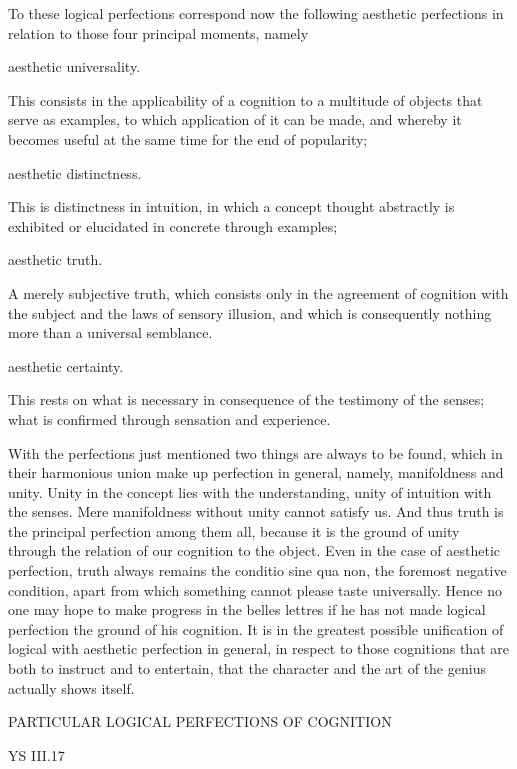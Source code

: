 To these logical perfections correspond now the following aesthetic
perfections in relation to those four principal moments, namely

aesthetic universality.

    This consists in the applicability of a cognition to a
    multitude of objects that serve as examples,
    to which application of it can be made,
    and whereby it becomes useful at the same time for the end of popularity;

aesthetic distinctness.

    This is distinctness in intuition, in which a concept
    thought abstractly is exhibited or elucidated in concrete through examples;

aesthetic truth.

    A merely subjective truth, which consists only in the agreement
    of cognition with the subject and the laws of sensory illusion,
    and which is consequently nothing more than a universal semblance.

aesthetic certainty.

    This rests on what is necessary in consequence of
    the testimony of the senses;
    what is confirmed through sensation and experience.

        With the perfections just mentioned two things are always to be found,
        which in their harmonious union make up perfection in general,
        namely, manifoldness and unity.
        Unity in the concept lies with the understanding,
        unity of intuition with the senses.
        Mere manifoldness without unity cannot satisfy us.
        And thus truth is the principal perfection among them all,
        because it is the ground of unity through
        the relation of our cognition to the object.
        Even in the case of aesthetic perfection,
        truth always remains the conditio sine qua non,
        the foremost negative condition,
        apart from which something cannot please taste universally.
        Hence no one may hope to make progress in the belles lettres
        if he has not made logical perfection the ground of his cognition.
        It is in the greatest possible unification of
        logical with aesthetic perfection in general,
        in respect to those cognitions that are both
        to instruct and to entertain,
        that the character and the art of
        the genius actually shows itself.

PARTICULAR LOGICAL PERFECTIONS OF COGNITION

YS III.17


